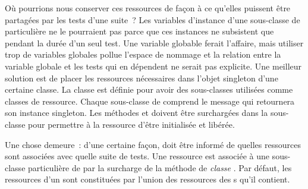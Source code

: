 \documentclass[a4paper,10pt,twoside]{book}
\begin{document}
Où pourrions nous conserver ces ressources de façon à ce qu'elles puissent être partagées par les tests d'une suite~?
Les variables d'instance d'une sous-classe de  particulière ne le pourraient pas parce que ces instances ne subsistent que pendant la durée d'un seul test.
Une variable globable ferait l'affaire, mais utiliser trop de variables globales pollue l'espace de nommage et la relation entre la variable globale et les tests qui en dépendent ne serait pas explicite.
Une meilleur solution est de placer les ressources nécessaires dans l'objet singleton d'une certaine classe. La classe  est définie pour avoir des sous-classes utilisées comme classes de ressource. Chaque sous-classe de  comprend le message  qui retournera son instance singleton.
Les méthodes   et  doivent être surchargées dans la sous-classe pour permettre à la ressource d'être initialisée et libérée.

Une chose demeure~: d'une certaine façon, \sunit doit être informé de quelles ressources sont associées avec quelle suite de tests. Une ressource est associée à une sous-classe particulière de  par la surcharge de la méthode de \emph{classe} .
Par défaut, les ressources d'un  sont constituées par l'union des ressources des s qu'il contient.

\end{document}
